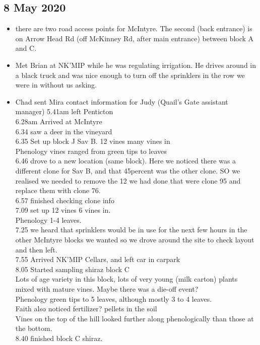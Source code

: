 \documentclass[11pt,letter]{article}
\newenvironment{smitemize}{
\begin{itemize}
  \setlength{\itemsep}{0pt}
  \setlength{\parskip}{0.8pt}
  \setlength{\parsep}{0pt}}
{\end{itemize}
}
\begin{document}
\subsection{8 May 2020}
\begin{smitemize}
\item there are two road access points for McIntyre. The second (back entrance) is on Arrow Head Rd (off McKinney Rd, after main entrance) between block A and C.
\item Met Brian at NK'MIP while he was regulating irrigation. He drives around in a black truck and was nice enough to turn off the sprinklers in the row we were in without us asking.
\item Chad sent Mira contact information for Judy (Quail's Gate assistant manager)
5.41am left Penticton \\
6.28am Arrived at McIntyre\\ 
6.34 saw a deer in the vineyard\\
6.35 Set up block J Sav B. 12 vines many vines in\\
Phenology vines ranged from green tips to leaves\\
6.46 drove to a new location (same block). Here we noticed there was a different clone for Sav B, and that 45percent was the other clone. SO we realised we needed to remove the 12 we had done that were clone 95 and replace them with clone 76. \\
6.57 finished checking clone info\\
7.09 set up 12 vines 6 vines in.\\
Phenology 1-4 leaves. \\
7.25 we heard that sprinklers would be in use for the next few hours in the other McIntyre blocks we wanted so we drove around the site to check layout and then left. \\
7.55 Arrived NK'MIP Cellars, and left car in carpark \\
8.05 Started sampling shiraz block C\\
Lots of age variety in this block, lots of very young (milk carton) plants mixed with mature vines. Maybe there was a die-off event? \\
Phenology green tips to 5 leaves, although mostly 3 to 4 leaves. \\
Faith also noticed fertilizer? pellets in the soil\\
Vines on the top of the hill looked further along phenologically than those at the bottom.\\
8.40 finished block C shiraz.\\

\end{smitemize}
\end{document}
